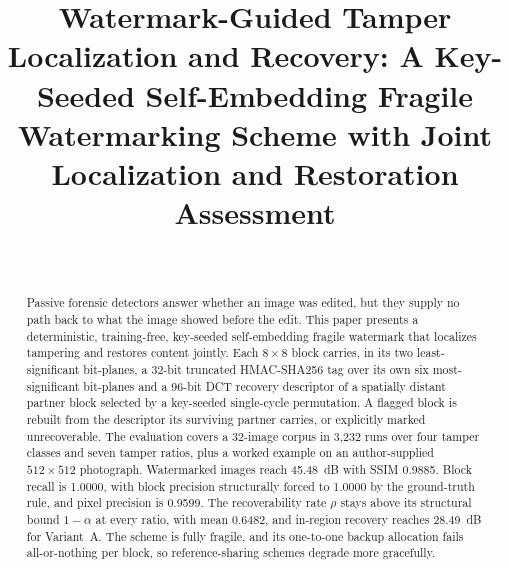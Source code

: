 \documentclass[conference]{IEEEtran}
\begin{document}
\title{Watermark-Guided Tamper Localization and Recovery: A Key-Seeded
Self-Embedding Fragile Watermarking Scheme with Joint Localization and
Restoration Assessment}

\author{%
\vspace{4pt}\\
}

\maketitle

\begin{abstract}
Passive forensic detectors answer whether an image was edited, but they supply no path back to what the image showed before the edit. This paper presents a deterministic, training-free, key-seeded self-embedding fragile watermark that localizes tampering and restores content jointly. Each $8{\times}8$ block carries, in its two least-significant bit-planes, a 32-bit truncated HMAC-SHA256 tag over its own six most-significant bit-planes and a 96-bit DCT recovery descriptor of a spatially distant partner block selected by a key-seeded single-cycle permutation. A flagged block is rebuilt from the descriptor its surviving partner carries, or explicitly marked unrecoverable. The evaluation covers a 32-image corpus in 3,232 runs over four tamper classes and seven tamper ratios, plus a worked example on an author-supplied $512{\times}512$ photograph. Watermarked images reach 45.48~dB with SSIM 0.9885. Block recall is 1.0000, with block precision structurally forced to 1.0000 by the ground-truth rule, and pixel precision is 0.9599. The recoverability rate $\rho$ stays above its structural bound $1-\alpha$ at every ratio, with mean 0.6482, and in-region recovery reaches 28.49~dB for Variant~A. The scheme is fully fragile, and its one-to-one backup allocation fails all-or-nothing per block, so reference-sharing schemes degrade more gracefully.
\end{abstract}
\end{document}
